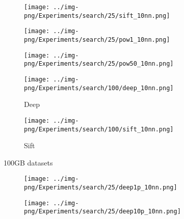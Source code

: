 \begin{figure}[!htb]
\begin{minipage}{0.6\textwidth}
                \begin{subfigure}{0.029\textwidth}
        \end{subfigure}
		\begin{subfigure}{0.314\textwidth}
			\texttt{[image: ../img-png/Experiments/search/25/sift\_10nn.png]}
			\caption{}  
			\label{fig:elpis:query:performance:25GB:sift:10NN}
		\end{subfigure}
	    \begin{subfigure}{0.314\textwidth}
		\texttt{[image: ../img-png/Experiments/search/25/pow1\_10nn.png]}
		\caption{} 
		\label{fig:query:performance:25GB:rand:pow1:10NN}
	\end{subfigure}
	    \begin{subfigure}{0.314\textwidth}
		\texttt{[image: ../img-png/Experiments/search/25/pow50\_10nn.png]}
		\caption{} 
		\label{fig:query:performance:25GB:rand:pow50:10NN}
	\end{subfigure}		
		\caption{{}}
		\label{fig:elpis:query:performance:25GB}
	\end{minipage}
	\begin{minipage}{\soneMs\textwidth}
		\captionsetup{justification=centering}
		\captionsetup[subfigure]{justification=centering}
		\begin{subfigure}{\textwidth}
			\texttt{[image: ../img-png/Experiments/search/100/deep\_10nn.png]}
			\caption{Deep}  
		\label{fig:elpis:query:performance:100GB:deep:10NN}
		\end{subfigure}
		\begin{subfigure}{\textwidth}
			\texttt{[image: ../img-png/Experiments/search/100/sift\_10nn.png]}
			\caption{Sift}  
			\label{fig:elpis:query:performance:100GB:sift:10NN}
		\end{subfigure}
		\caption{{100GB datasets}}	
		\label{fig:elpis:query:performance:100GB}
	\end{minipage}
	\begin{minipage}{\soneMs\textwidth}
		\captionsetup{justification=centering}
		\captionsetup[subfigure]{justification=centering}
		\begin{subfigure}{\textwidth}
		\texttt{[image: ../img-png/Experiments/search/25/deep1p\_10nn.png]}
		\caption{\textbf{}} 
		\label{fig:search:query:performance:25GB:hard:1p}
		\end{subfigure}
		\begin{subfigure}{\textwidth}
		\texttt{[image: ../img-png/Experiments/search/25/deep10p\_10nn.png]}
		\caption{\textbf{}} 
		\label{fig:search:query:performance:25GB:hard:10p}
		\end{subfigure}
	\caption{}
		\label{fig:search:query:performance:25GB:hard}
	\end{minipage}
\end{figure}



